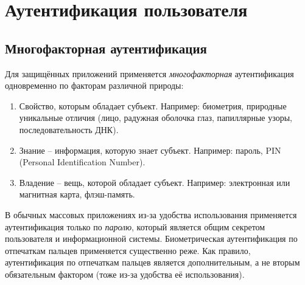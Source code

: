 




\chapter{Аутентификация пользователя}


\section{Многофакторная аутентификация}

Для защищённых приложений применяется \emph{многофакторная} аутентификация одновременно по факторам различной природы:
\begin{enumerate}
    \item Свойство, которым обладает субъект. Например: биометрия, природные уникальные отличия (лицо, радужная оболочка глаз, папиллярные узоры, последовательность ДНК).
    \item Знание -- информация, которую знает субъект. Например: пароль, PIN (Personal Identification Number).
    \item Владение -- вещь, которой обладает субъект. Например: электронная или магнитная карта, флэш-память.
\end{enumerate}

В обычных массовых приложениях из-за удобства использования применяется аутентификация только по \emph{паролю}, который является общим секретом пользователя и информационной системы. Биометрическая аутентификация по отпечаткам пальцев применяется существенно реже. Как правило, аутентификация по отпечаткам пальцев является дополнительным, а не вторым обязательным фактором (тоже из-за удобства её использования).



